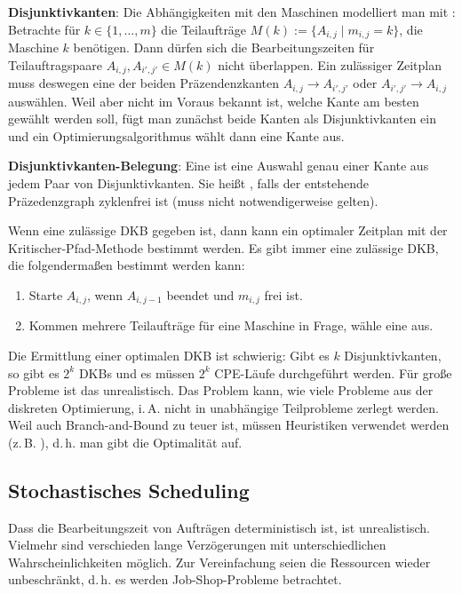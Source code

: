 \textbf{Disjunktivkanten}:
Die Abhängigkeiten mit den Maschinen modelliert man mit :
Betrachte für $k \in \{1, \dotsc, m\}$ die Teilaufträge $M(k) := \{A_{i,j} \;|\; m_{i,j} = k\}$,
die Maschine $k$ benötigen.
Dann dürfen sich die Bearbeitungszeiten für Teilauftragspaare $A_{i,j}, A_{i',j'} \in M(k)$
nicht überlappen.
Ein zulässiger Zeitplan muss deswegen eine der beiden Präzendenzkanten $A_{i,j} \to A_{i',j'}$ oder
$A_{i',j'} \to A_{i,j}$ auswählen.
Weil aber nicht im Voraus bekannt ist, welche Kante am besten gewählt werden soll,
fügt man zunächst beide Kanten als Disjunktivkanten ein und
ein Optimierungsalgorithmus wählt dann eine Kante aus.

\textbf{Disjunktivkanten-Belegung}:
Eine  ist eine Auswahl genau einer Kante aus jedem Paar
von Disjunktivkanten.
Sie heißt , falls der entstehende Präzedenzgraph zyklenfrei ist
(muss nicht notwendigerweise gelten).

Wenn eine zulässige DKB gegeben ist, dann kann ein optimaler Zeitplan
mit der Kritischer-Pfad-Methode bestimmt werden.
Es gibt immer eine zulässige DKB, die folgendermaßen bestimmt werden kann:
\begin{enumerate}
    \item
    Starte $A_{i,j}$, wenn $A_{i,j-1}$ beendet und $m_{i,j}$ frei ist.
    
    \item 
    Kommen mehrere Teilaufträge für eine Maschine in Frage, wähle eine aus.
\end{enumerate}

Die Ermittlung einer optimalen DKB ist schwierig:
Gibt es $k$ Disjunktivkanten, so gibt es $2^k$ DKBs und es müssen $2^k$ CPE-Läufe durchgeführt
werden.
Für große Probleme ist das unrealistisch.
Das Problem kann, wie viele Probleme aus der diskreten Optimierung, i.\,A. nicht in unabhängige
Teilprobleme zerlegt werden.
Weil auch Branch-and-Bound zu teuer ist, müssen Heuristiken verwendet werden
(z.\,B. ), d.\,h. man gibt die Optimalität auf.

\pagebreak

\subsection{%
    Stochastisches Scheduling%
}

Dass die Bearbeitungszeit von Aufträgen deterministisch ist, ist unrealistisch.
Vielmehr sind verschieden lange Verzögerungen mit unterschiedlichen Wahrscheinlichkeiten möglich.
Zur Vereinfachung seien die Ressourcen wieder unbeschränkt,
d.\,h. es werden Job-Shop-Probleme betrachtet.

